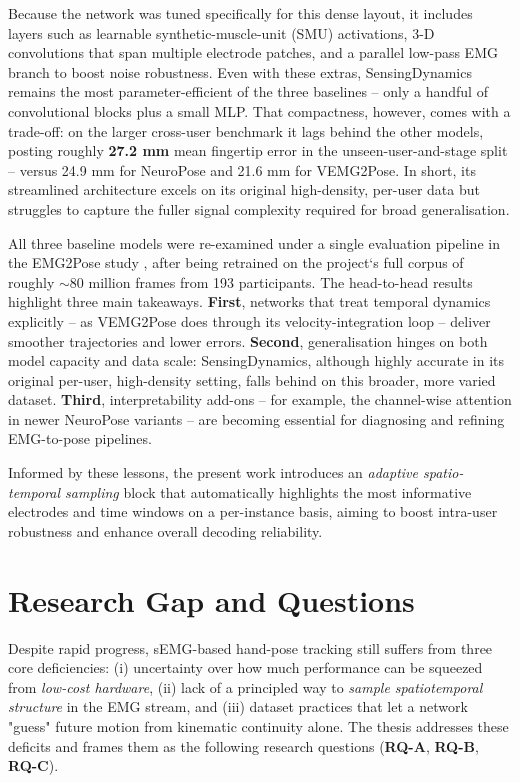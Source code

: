 Because the network was tuned specifically for this dense layout, it includes layers such as learnable synthetic-muscle-unit (SMU) activations, 3-D convolutions that span multiple electrode patches, and a parallel low-pass EMG branch to boost noise robustness. Even with these extras, SensingDynamics remains the most parameter-efficient of the three baselines -- only a handful of convolutional blocks plus a small MLP. That compactness, however, comes with a trade-off: on the larger cross-user benchmark it lags behind the other models, posting roughly \textbf{27.2 mm} mean fingertip error in the unseen-user-and-stage split -- versus 24.9 mm for NeuroPose and 21.6 mm for VEMG2Pose. In short, its streamlined architecture excels on its original high-density, per-user data but struggles to capture the fuller signal complexity required for broad generalisation.

All three baseline models were re-examined under a single evaluation pipeline in the EMG2Pose study \cite{salter2024emg2pose}, after being retrained on the project`s full corpus of roughly \(\sim\!80\) million frames from 193 participants. The head-to-head results highlight three main takeaways.  
\textbf{First}, networks that treat temporal dynamics explicitly -- as VEMG2Pose does through its velocity-integration loop -- deliver smoother trajectories and lower errors.  
\textbf{Second}, generalisation hinges on both model capacity and data scale: SensingDynamics, although highly accurate in its original per-user, high-density setting, falls behind on this broader, more varied dataset.  
\textbf{Third}, interpretability add-ons -- for example, the channel-wise attention in newer NeuroPose variants -- are becoming essential for diagnosing and refining EMG-to-pose pipelines.  

Informed by these lessons, the present work introduces an \emph{adaptive spatio-temporal sampling} block that automatically highlights the most informative electrodes and time windows on a per-instance basis, aiming to boost intra-user robustness and enhance overall decoding reliability.

\section{Research Gap and Questions}
\label{sec:gap}

Despite rapid progress, sEMG-based hand-pose tracking still suffers from three
core deficiencies: (i) uncertainty over how much performance can be squeezed
from \emph{low-cost hardware}, (ii) lack of a principled way to \emph{sample
spatiotemporal structure} in the EMG stream, and (iii) dataset practices that
let a network "guess" future motion from kinematic continuity alone.  
The thesis addresses these deficits and frames them as the following research
questions (\textbf{RQ-A}, \textbf{RQ-B}, \textbf{RQ-C}).

